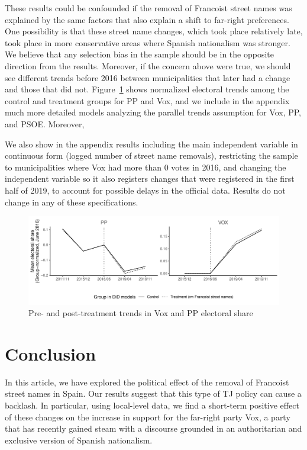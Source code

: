 \documentclass[12pt, notitlepage]{article}
\begin{document}
These results could be confounded if the removal of Francoist street names was explained by the same factors that also explain a shift to far-right preferences.
One possibility is that these street name changes, which took place relatively late, took place in more conservative areas where Spanish nationalism was stronger.
We believe that any selection bias in the sample should be in the opposite direction from the results.
Moreover, if the concern above were true, we should see different trends before 2016 between municipalities that later had a change and those that did not.
Figure~\ref{fig:par_trends_norm} shows normalized electoral trends among the control and treatment groups for PP and Vox, and we include in the appendix much more detailed models analyzing the parallel trends assumption for Vox, PP, and PSOE.
Moreover,

We also show in the appendix results including the main independent variable in continuous form (logged number of street name removals), restricting the sample to municipalities where Vox had more than 0 votes in 2016, and changing the independent variable so it also registers changes that were registered in the first half of 2019, to account for possible delays in the official data.
Results do not change in any of these specifications.


\begin{figure}[htb!]
\centering

  \includegraphics[width = \textwidth]{img/par_trends_norm}

  \caption{Pre- and post-treatment trends in Vox and PP electoral share}\label{fig:par_trends_norm}

\end{figure}

\section*{Conclusion}

In this article, we have explored the political effect of the removal of Francoist street names in Spain.
Our results suggest that this type of TJ policy can cause a backlash.
In particular, using local-level data, we find a short-term positive effect of these changes on the increase in support for the far-right party Vox, a party that has recently gained steam with a discourse grounded in an authoritarian and exclusive version of Spanish nationalism.
\end{document}
